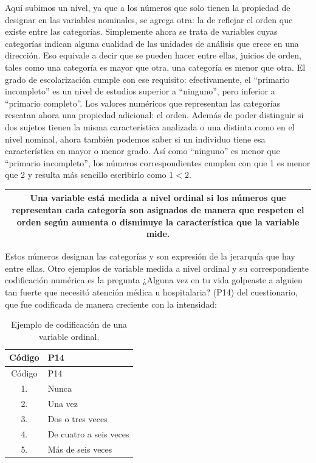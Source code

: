 \documentclass[]{book}
\begin{document}
Aquí subimos un nivel, ya que a los números que solo tienen la propiedad de designar en las variables nominales, se agrega otra: la de reflejar el orden que existe entre las categorías.
Simplemente ahora se trata de variables cuyas categorías indican alguna cualidad de las unidades de análisis que crece en una dirección. Eso equivale a decir que se pueden hacer entre ellas, juicios de orden, tales como una categoría es mayor que otra, una categoría es menor que otra. El grado de escolarización cumple con ese requisito: efectivamente, el ``primario incompleto'' es un nivel de estudios superior a ``ninguno'', pero inferior a ``primario completo''.
Los valores numéricos que representan las categorías rescatan ahora una propiedad adicional: el orden. Además de poder distinguir si dos sujetos tienen la misma característica analizada o una distinta como en el nivel nominal, ahora también podemos saber si un individuo tiene esa característica en mayor o menor grado. Así como ``ninguno'' es menor que ``primario incompleto'', los números correspondientes cumplen con que 1 es menor que 2 y resulta más sencillo escribirlo como \(1 < 2\).

\begin{longtable}[]{@{}c@{}}
\toprule
\endhead
\begin{minipage}[t]{0.97\columnwidth}\centering
Una variable está medida a nivel \textbf{ordinal} si los números que representan cada categoría son asignados de manera que respeten el orden según aumenta o disminuye la característica que la variable mide.\strut
\end{minipage}\tabularnewline
\bottomrule
\end{longtable}

Estos números designan las categorías y son expresión de la jerarquía que hay entre ellas. Otro ejemplos de variable medida a nivel ordinal y su correspondiente codificación numérica es la pregunta ¿Alguna vez en tu vida golpeaste a alguien tan fuerte que necesitó atención médica u hospitalaria? (P14) del cuestionario, que fue codificada de manera creciente con la intensidad:

\begin{longtable}[]{@{}cl@{}}
\caption{\label{tab:unnamed-chunk-29}Ejemplo de codificación de una variable ordinal.}\tabularnewline
\toprule
Código & P14\tabularnewline
\midrule
\endfirsthead
\toprule
Código & P14\tabularnewline
\midrule
\endhead
1. & Nunca\tabularnewline
2. & Una vez\tabularnewline
3. & Dos o tres veces\tabularnewline
4. & De cuatro a seis veces\tabularnewline
5. & Más de seis veces\tabularnewline
\bottomrule
\end{longtable}
\end{document}
